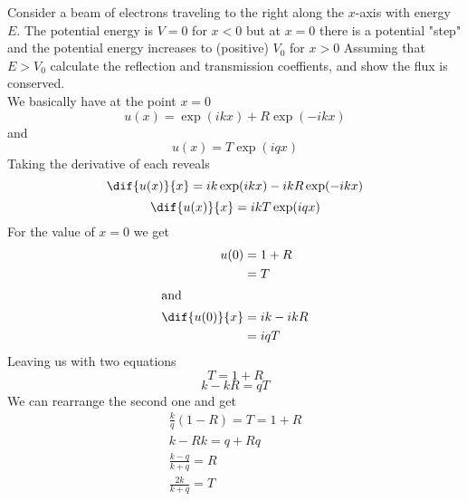 \begin{example}
	Consider a beam of electrons traveling to the right along the $ x $-axis with energy $ E $. The potential energy is $ V = 0 $ for $ x < 0 $ but at $ x = 0 $ there is a potential "step" and the potential energy increases to (positive) $ V_0 $ for $ x > 0 $ Assuming that $ E > V_0 $ calculate the reflection and transmission coeffients, and show the flux is conserved. \\
	We basically have at the point $ x = 0 $
	\[ u(x) = \exp(ikx) + R \exp(-ikx) \]
	and
	\[ u(x) = T \exp(iqx) \]
	Taking the derivative of each reveals 
	\[ \dif{u(x)}{x} = ik\exp(ikx) - ikR \exp(-ikx) \]
	\[ \dif{u(x)}{x} = ik T \exp(iqx) \]
	For the value of $ x = 0 $ we get 
	\begin{align*}
	u(0) &= 1 + R \\
	&= T \\
	\intertext{and}
	\dif{u(0)}{x} &= ik - ikR \\
	&= iqT
	\end{align*}
	Leaving us with two equations
	\[ T = 1 + R \]
	\[ k - kR = qT \]
	We can rearrange the second one and get
	\begin{align*}
	\frac{k}{q} (1 - R) = T = 1 +R \\
	k - Rk = q + Rq \\
	\frac{k-q}{k+q} = R \\
	\frac{2k}{k+q} = T
	\end{align*}
\end{example}

